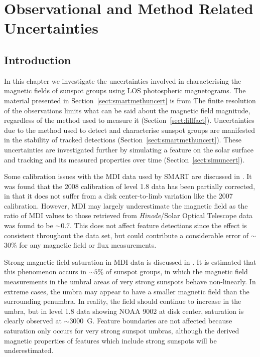 
\chapter[Uncertainties]{Observational and Method Related Uncertainties} %
\label{chapter:results_uncert}

\graphicspath{{4/figures/EPS/}{4/figures/}}

\section{Introduction}\label{sect:uncertint}

In this chapter we investigate the uncertainties involved in characterising the magnetic fields of sunspot groups using \gls{LOS} photospheric magnetograms. The material presented in Section~\ref{sect:smartmethuncert} is from \cite{higgins:2011} The finite resolution of the observations limits what can be said about the magnetic field magnitude, regardless of the method used to measure it (Section~\ref{sect:fillfact}). Uncertainties due to the method used to detect and characterise sunspot groups are manifested in the stability of tracked detections (Section~\ref{sect:smartmethuncert}). These uncertainties are investigated further by simulating a feature on the solar surface and tracking and its measured properties over time (Section~\ref{sect:simuncert}).

Some calibration issues with the \gls{MDI} data used by \gls{SMART} are discussed in \citet{Wang:2009}. It was found that the 2008 calibration of level 1.8 data has been partially corrected, in that it does not suffer from a disk center-to-limb variation like the 2007 calibration. However, \gls{MDI} may largely underestimate the magnetic field as the ratio of \gls{MDI} values to those retrieved from \emph{Hinode}/Solar Optical Telescope data was found to be $\sim$$0.7$. This does not affect feature detections since the effect is consistent throughout the data set, but could contribute a considerable error of $\sim$$30\%$ for any magnetic field or flux measurements. 

Strong magnetic field saturation in \gls{MDI} data is discussed in \citet{Liu:2007}. It is estimated that this phenomenon occurs in $\sim$$5\%$ of sunspot groups, in which the magnetic field measurements in the umbral areas of very strong sunspots behave non-linearly. In extreme cases, the umbra may appear to have a smaller magnetic field than the surrounding \gls{penumbra}. In reality, the field should continue to increase in the \gls{umbra}, but in level 1.8 data showing \gls{NOAA} 9002 at disk center, saturation is clearly observed at $\sim$$3000$~G. Feature boundaries are not affected because saturation only occurs for very strong sunspot \glspl{umbra}, although the derived magnetic properties of features which include strong sunspots will be underestimated. 

